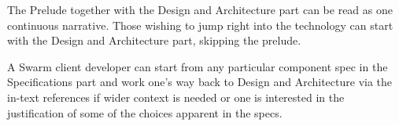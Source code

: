 The Prelude together with the Design and Architecture part can be read as one continuous narrative. Those wishing to jump right into the technology can start with the Design and Architecture part, skipping the prelude.

A Swarm client developer can start from any particular component spec in the Specifications part and work one's way back to Design and Architecture via the in-text references if wider context is needed or one is interested in the justification of some of the choices apparent in the specs.

